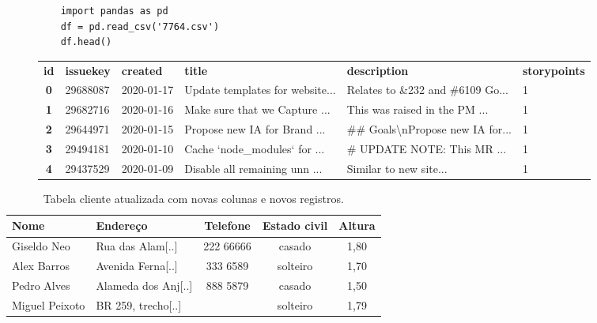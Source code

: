 \documentclass[a4paper,12pt]{book}
\begin{document}
\begin{figure}
	\begin{lstlisting}
	import pandas as pd
	df = pd.read_csv('7764.csv')
	df.head()
	\end{lstlisting}

	\begin{tabular}{clllll}
	\multicolumn{1}{l}{\textbf{id}} &
	\multicolumn{1}{l}{\textbf{issuekey}} &
	\multicolumn{1}{l}{\textbf{created}} &
	\multicolumn{1}{l}{\textbf{title}} &
	\multicolumn{1}{l}{\textbf{description}} &
	\multicolumn{1}{l}{\textbf{storypoints}} \\
	\textbf{0} &
	  29688087 &
	  2020-01-17 &
	  Update templates for website... &
	  Relates to \&232 and \#6109 Go... &
	  1 \\
	\textbf{1} &
	  29682716 &
	  2020-01-16 &
	  Make sure that we Capture  ... &
	  This was raised in the PM ... &
	  1 \\
	\textbf{2} &
	  29644971 &
	  2020-01-15 &
	  Propose new IA for Brand ... &
	  \#\# Goals\textbackslash{}nPropose new IA for... &
	  1 \\
	\textbf{3} &
	  29494181 &
	  2020-01-10 &
	  Cache `node\_modules` for ... &
	  \# UPDATE NOTE: This MR ... &
	  1 \\
	\textbf{4} &
	  29437529 &
	  2020-01-09 &
	  Disable all remaining unn ... &
	  Similar to new site... &
	  1
	\end{tabular}%
	\label{tbl:storypoint}

\end{figure}

\begin{table}
	\centering
	\caption{Tabela cliente atualizada com novas colunas e novos registros.}
	\begin{tabular}{|l|l|c|c|c|}
	\hline
	\textbf{Nome} & \textbf{Endereço} & \textbf{Telefone} & \textbf{Estado civil} & \textbf{Altura} \\
	\hline
	Giseldo Neo & Rua das Alam[..] & 222 66666 & casado & 1,80\\
	\hline
	Alex Barros & Avenida Ferna[..]& 333 6589 & solteiro & 1,70 \\
	\hline
	Pedro Alves & Alameda dos Anj[..]& 888 5879 & casado & 1,50 \\
	\hline
	Miguel Peixoto & BR 259, trecho[..]&  & solteiro & 1,79 \\
	\hline
	\end{tabular}
	\label{tbl:cliente_v2}
\end{table}
\end{document}
